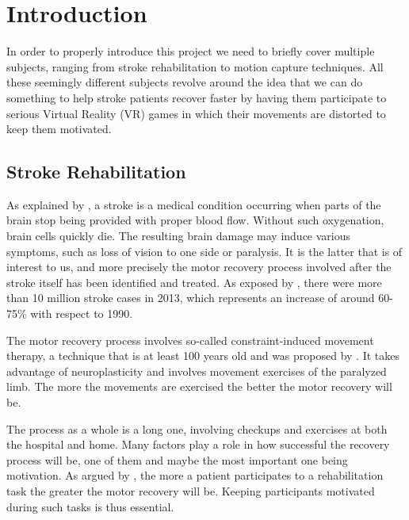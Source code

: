 
\chapter{Introduction} %

\label{Chapter1} %


In order to properly introduce this project we need to briefly cover multiple subjects, ranging from stroke rehabilitation to motion capture techniques. All these seemingly different subjects revolve around the idea that we can do something to help stroke patients recover faster by having them participate to serious Virtual Reality (VR) games in which their movements are distorted to keep them motivated.

\section{Stroke Rehabilitation}
As explained by \cite{nhlbi2017what}, a stroke is a medical condition occurring when parts of the brain stop being provided with proper blood flow. Without such oxygenation, brain cells quickly die. The resulting brain damage may induce various symptoms, such as loss of vision to one side or paralysis. It is the latter that is of interest to us, and more precisely the motor recovery process involved after the stroke itself has been identified and treated. As exposed by \cite{vos2015global}, there were more than 10 million stroke cases in 2013, which represents an increase of around 60-75\% with respect to 1990.

The motor recovery process involves so-called constraint-induced movement therapy, a technique that is at least 100 years old and was proposed by \cite{oden1918systematic}. It takes advantage of neuroplasticity and involves movement exercises of the paralyzed limb. The more the movements are exercised the better the motor recovery will be.

The process as a whole is a long one, involving checkups and exercises at both the hospital and home. Many factors play a role in how successful the recovery process will be, one of them and maybe the most important one being motivation. As argued by \cite{flores2008improving}, the more a patient participates to a rehabilitation task the greater the motor recovery will be. Keeping participants motivated during such tasks is thus essential.

